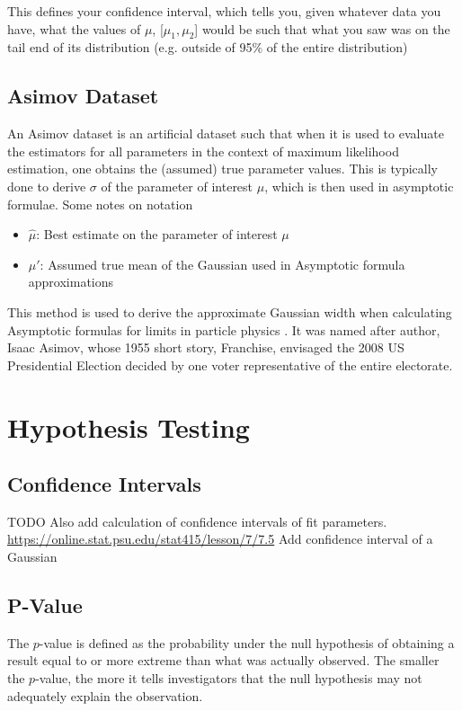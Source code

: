 This defines your confidence interval, which tells you, given whatever data you have, what the values of $\mu$,  [$\mu_1, \mu_2$] would be such that what you saw was on the tail end of its distribution (e.g. outside of 95\% of the entire distribution)

\subsection{Asimov Dataset}
An Asimov dataset is an artificial dataset such that when it is used to evaluate the estimators for all parameters in the context of maximum likelihood estimation, one obtains the (assumed) true parameter values. This is typically done to derive $\sigma$ of the parameter of interest $\mu$, which is then used in asymptotic formulae. Some notes on notation
\begin{itemize}
	\item $\hat{\mu}$: Best estimate on the parameter of interest $\mu$
	\item $\mu'$: Assumed true mean of the Gaussian used in Asymptotic formula approximations
\end{itemize}
This method is used to derive the approximate Gaussian width when calculating Asymptotic formulas for limits in particle physics \cite{cowan}. It was named after author, Isaac Asimov, whose 1955 short story, Franchise, envisaged the 2008 US Presidential Election decided by one voter representative of the entire electorate.



\section{Hypothesis Testing}

\subsection{Confidence Intervals}
TODO
Also add calculation of confidence intervals of fit parameters.
\url{https://online.stat.psu.edu/stat415/lesson/7/7.5}
Add confidence interval of a Gaussian

\subsection{P-Value}
The $p$-value is defined as the probability under the null hypothesis of obtaining a result equal to or more extreme than what was actually observed. The smaller the $p$-value, the more it tells investigators that the null hypothesis may not adequately explain the observation.


